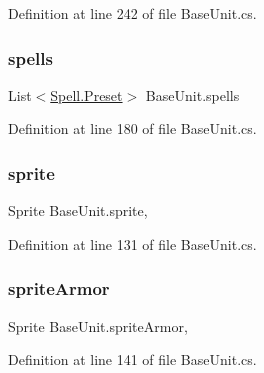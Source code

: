 Definition at line 242 of file Base\+Unit.\+cs.

\mbox{\label{class_base_unit_a97c7ef05e0978898a08cde269786c05c}} 
\subsubsection{\texorpdfstring{spells}{spells}}
{\footnotesize\ttfamily List$<$\mbox{\hyperlink{class_spell_a5520e850e7000a6156b3456672b72ed1}{Spell.\+Preset}}$>$ Base\+Unit.\+spells\hspace{0.3cm}{\ttfamily [get]}}



Definition at line 180 of file Base\+Unit.\+cs.

\mbox{\label{class_base_unit_aa23a25b8e47771e1237a00c602707090}} 
\subsubsection{\texorpdfstring{sprite}{sprite}}
{\footnotesize\ttfamily Sprite Base\+Unit.\+sprite\hspace{0.3cm}{\ttfamily [get]}, {\ttfamily [set]}}



Definition at line 131 of file Base\+Unit.\+cs.

\mbox{\label{class_base_unit_a565598994319c552e26a01a9ef0bd0f0}} 
\subsubsection{\texorpdfstring{spriteArmor}{spriteArmor}}
{\footnotesize\ttfamily Sprite Base\+Unit.\+sprite\+Armor\hspace{0.3cm}{\ttfamily [get]}, {\ttfamily [set]}}



Definition at line 141 of file Base\+Unit.\+cs.

\mbox{\label{class_base_unit_ad2e3074297492cd54d7c08fa10d529d1}} 

